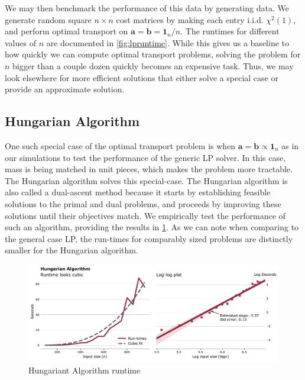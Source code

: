 \documentclass{article}
\theoremstyle{definition}
\theoremstyle{remark}
\begin{document}
We may then benchmark the performance of this data by generating data. We
generate random square $n \times n$ cost matrices by making each entry i.i.d.
$\chi^2(1)$, and perform optimal transport on $\mathbf{a} = \mathbf{b} =
\mathbf{1}_n / n$. The runtimes for different values of $n$ are documented in
\cref{fig:lpruntime}. While this gives us a baseline to how quickly we can
compute optimal transport problems, solving the problem for $n$ bigger than a
couple dozen quickly becomes an expensive task. Thus, we may look elsewhere for
more efficient solutions that either solve a special case or provide an
approximate solution.


\subsection{Hungarian Algorithm} %
\label{sub:hungarian_algorithm}

One such special case of the optimal transport problem is when $\mathbf{a} =
\mathbf{b} \propto \mathbf{1}_n$ as in our simulations to test the performance
of the generic LP solver. In this case, mass is being matched in unit pieces,
which makes the problem more tractable. The Hungarian algorithm solves this
special-case. The Hungarian algorithm is also called a dual-ascent method
because it starts by establishing feasible solutions to the primal and dual
problems, and proceeds by improving these solutions until their objectives
match. We empirically test the performance of such an algorithm, providing the
results in \cref{fig:hungarianruntime}. As we can note when comparing to the
general case LP, the run-times for comparably sized problems are distinctly
smaller for the Hungarian algorithm.

\begin{figure}[h]
\includegraphics[width=\textwidth]{../../code/hungarianruntime.pdf}
\caption{Hungariant Algorithm runtime}
\label{fig:hungarianruntime}
\end{figure}
\end{document}
